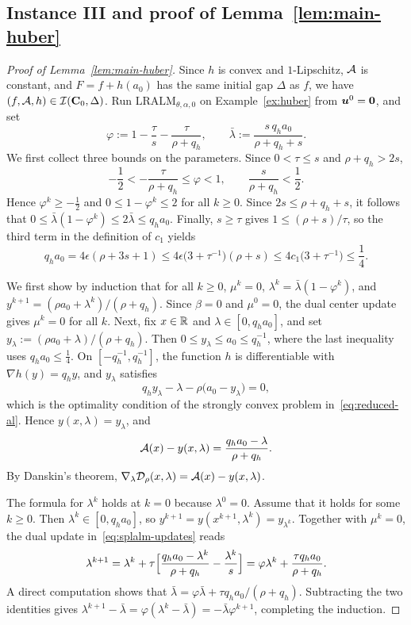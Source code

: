 \subsection{Instance III and proof of Lemma~\ref{lem:main-huber}}
\label{subsec:lb-huber}

\begin{proof}[Proof of Lemma~\ref{lem:main-huber}]
Since \(h\) is convex and \(1\)-Lipschitz, \(\mathcal{A}\) is constant, and
\(F=f+h(a_0)\) has the same initial gap \(\Delta\) as \(f\), we have
\((f,\mathcal{A},h)\in\mathcal I(\mathbf C_0,\Delta)\).
Run \(\mathrm{LRALM}_{\theta,\alpha,0}\) on Example~\ref{ex:huber} from
\(\bm{u}^0=\bm{0}\), and set
\[
\varphi:=1-\frac{\tau}{s}-\frac{\tau}{\rho+q_h},
\qquad
\bar\lambda:=\frac{s\,q_ha_0}{\rho+q_h+s}.
\]
We first collect three bounds on the parameters. Since \(0<\tau\le s\) and
\(\rho+q_h>2s\),
\begin{equation}
\label{eq:huber-ratio}
-\frac12<-\frac{\tau}{\rho+q_h}\le\varphi<1,
\qquad
\frac{s}{\rho+q_h}<\frac12 .
\end{equation}
Hence \(\varphi^k\ge-\frac12\) and \(0\le1-\varphi^k\le2\) for all
\(k\ge0\). Since \(2s\le\rho+q_h+s\), it follows that
\(0\le\bar\lambda(1-\varphi^k)\le2\bar\lambda\le q_ha_0\). Finally,
\(s\ge\tau\) gives \(1\le(\rho+s)/\tau\), so the third term in the
definition of \(c_1\) yields
\[
q_ha_0=4\epsilon(\rho+3s+1)
\le4\epsilon\bigl(3+\tau^{-1}\bigr)(\rho+s)
\le4c_1\bigl(3+\tau^{-1}\bigr)
\le\frac14 .
\]

We first show by induction that for all \(k\ge0\),
\(\mu^k=0\), \(\lambda^k=\bar\lambda(1-\varphi^k)\), and
\(y^{k+1}=(\rho a_0+\lambda^k)/(\rho+q_h)\). Since \(\beta=0\) and \(\mu^0=0\),
the dual center update gives \(\mu^k=0\) for all \(k\). Next, fix \(x\in\mathbb{R}\)
and \(\lambda\in[0,q_ha_0]\), and set
\(y_\lambda:=(\rho a_0+\lambda)/(\rho+q_h)\). Then
\(0\le y_\lambda\le a_0\le q_h^{-1}\), where the last inequality uses
\(q_ha_0\le\frac14\). On \([-q_h^{-1},q_h^{-1}]\), the function \(h\) is
differentiable with \(\nabla h(y)=q_hy\), and \(y_\lambda\) satisfies
\[
q_hy_\lambda-\lambda-\rho\bigl(a_0-y_\lambda\bigr)=0,
\]
which is the optimality condition of the strongly convex problem
in~\eqref{eq:reduced-al}. Hence \(y(x,\lambda)=y_\lambda\), and
\[
\mathcal{A}(x)-y(x,\lambda)=\frac{q_ha_0-\lambda}{\rho+q_h}.
\]
By Danskin's theorem,
\(\nabla_\lambda\mathcal{D}_\rho(x,\lambda)=\mathcal{A}(x)-y(x,\lambda)\).

The formula for \(\lambda^k\) holds at \(k=0\) because \(\lambda^0=0\).
Assume that it holds for some \(k\ge0\). Then \(\lambda^k\in[0,q_ha_0]\), so
\(y^{k+1}=y(x^{k+1},\lambda^k)=y_{\lambda^k}\). Together with \(\mu^k=0\), the
dual update in~\eqref{eq:splalm-updates} reads
\[
\lambda^{k+1}
=\lambda^k+\tau\Bigl[\frac{q_ha_0-\lambda^k}{\rho+q_h}
-\frac{\lambda^k}{s}\Bigr]
=\varphi\lambda^k+\frac{\tau q_ha_0}{\rho+q_h}.
\]
A direct computation shows that
\(\bar\lambda=\varphi\bar\lambda+\tau q_ha_0/(\rho+q_h)\). Subtracting the
two identities gives
\(\lambda^{k+1}-\bar\lambda=\varphi(\lambda^k-\bar\lambda)
=-\bar\lambda\varphi^{k+1}\), completing the induction.


\end{proof}
